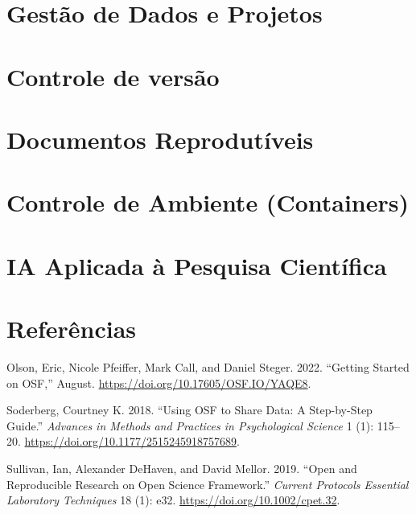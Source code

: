 \documentclass[
  a4paper,
]{article}
\newlength{\cslhangindent}
\newenvironment{CSLReferences}[2] %
 {\begin{list}{}{%
  \setlength{\itemindent}{0pt}
  \setlength{\leftmargin}{0pt}
  \setlength{\parsep}{0pt}
  \ifodd #1
   \setlength{\leftmargin}{\cslhangindent}
   \setlength{\itemindent}{-1\cslhangindent}
  \fi
  \setlength{\itemsep}{#2\baselineskip}}}
 {\end{list}}
\begin{document}

\section{Gestão de Dados e Projetos}\label{sec-project}


\section{Controle de versão}\label{sec-git}


\section{Documentos Reprodutíveis}\label{sec-quarto}


\section{Controle de Ambiente (Containers)}\label{sec-docker}


\section{IA Aplicada à Pesquisa Científica}\label{sec-AI}


\section*{Referências}\label{referuxeancias}


\label{refs}
\begin{CSLReferences}{1}{0}
Olson, Eric, Nicole Pfeiffer, Mark Call, and Daniel Steger. 2022.
{``Getting Started on OSF,''} August.
\url{https://doi.org/10.17605/OSF.IO/YAQE8}.

Soderberg, Courtney K. 2018. {``Using OSF to Share Data: A Step-by-Step
Guide.''} \emph{Advances in Methods and Practices in Psychological
Science} 1 (1): 115--20. \url{https://doi.org/10.1177/2515245918757689}.

Sullivan, Ian, Alexander DeHaven, and David Mellor. 2019. {``Open and
Reproducible Research on Open Science Framework.''} \emph{Current
Protocols Essential Laboratory Techniques} 18 (1): e32.
\url{https://doi.org/10.1002/cpet.32}.

\end{CSLReferences}
\end{document}
